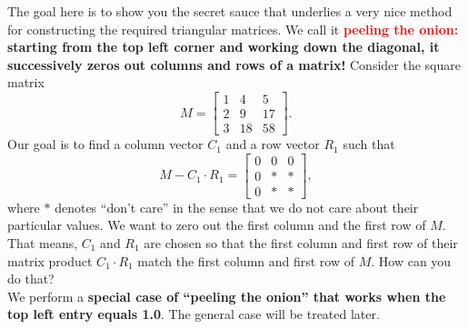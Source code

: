 \begin{example}
The goal here is to show you the secret sauce that underlies a very nice method for constructing the required triangular matrices. We call it \textcolor{red}{\bf peeling the onion:} \textbf{starting from the top left corner and working down the diagonal, it successively zeros out columns and rows of a matrix!} Consider the square matrix 
$$M=\left[\begin{array}{rrr} 
    1   &  4   &  5 \\
     2  &   9  &  17 \\
     3  &  18  &  58 \end{array}  \right]. $$
Our goal is to find a column vector $C_1$ and a row vector $R_1$ such that  $$M-C_1 \cdot R_1 = \left[\begin{array}{rrr} 
    0  &  0   &  0 \\
     0  &   \ast &  \ast \\
    0  &  \ast  &  \ast \end{array}  \right], $$   
where $\ast$ denotes ``don't care'' in the sense that we do not care about their particular values. We want to zero out the first column and the first row of $M$. That means, $C_1$ and $R_1$ are chosen so that the first column and first row of their matrix product $C_1 \cdot R_1$ match the first column and first row of $M$. How can you do that?\\

We perform a \textbf{special case  of ``peeling the onion'' that works when the top left entry equals 1.0}. The general case will be treated later.\\


\end{example}
